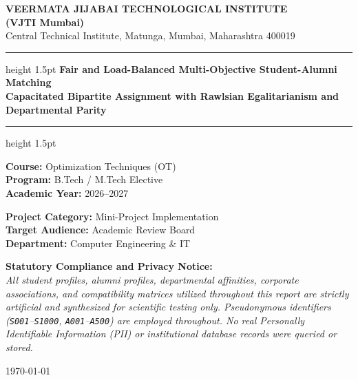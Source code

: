 \documentclass[11pt,a4paper,oneside]{report}
\begin{document}
\begin{titlepage}
    \centering
    \vspace*{0.5cm}
    
    {\Huge \bfseries \color{vjtiMaroon} VEERMATA JIJABAI TECHNOLOGICAL INSTITUTE}\\[0.3cm]
    {\Large \bfseries (VJTI Mumbai)}\\[0.2cm]
    {\normalsize Central Technical Institute, Matunga, Mumbai, Maharashtra 400019}\\[1.2cm]
    
    \hrule height 1.5pt \vspace{0.4cm}
    {\huge \bfseries Fair and Load-Balanced Multi-Objective Student-Alumni Matching}\\[0.4cm]
    {\LARGE \bfseries Capacitated Bipartite Assignment with Rawlsian Egalitarianism and Departmental Parity}\\[0.4cm]
    \hrule height 1.5pt \vspace{1.2cm}
    
    \begin{minipage}{0.48\textwidth}
        \flushleft
        \textbf{\large Course:} Optimization Techniques (OT)\\
        \textbf{\large Program:} B.Tech / M.Tech Elective\\
        \textbf{\large Academic Year:} 2026--2027
    \end{minipage}
    \hfill
    \begin{minipage}{0.48\textwidth}
        \flushright
        \textbf{\large Project Category:} Mini-Project Implementation\\
        \textbf{\large Target Audience:} Academic Review Board\\
        \textbf{\large Department:} Computer Engineering \& IT
    \end{minipage}
    
    \vfill
    
    \begin{minipage}{0.9\textwidth}
        \centering
        \small
        \textbf{Statutory Compliance and Privacy Notice:}\\
        \textit{All student profiles, alumni profiles, departmental affinities, corporate associations, and compatibility matrices utilized throughout this report are strictly artificial and synthesized for scientific testing only. Pseudonymous identifiers (\texttt{S001}--\texttt{S1000}, \texttt{A001}--\texttt{A500}) are employed throughout. No real Personally Identifiable Information (PII) or institutional database records were queried or stored.}
    \end{minipage}
    
    \vspace{1cm}
    {\large \today}
\end{titlepage}
\end{document}
